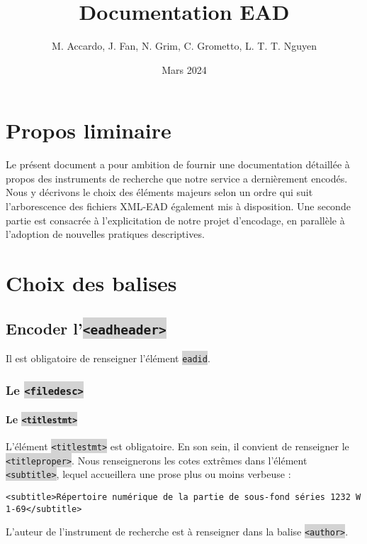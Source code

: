 \documentclass[hidelinks, 13pt]{report}
\title{Documentation EAD}
\date{Mars 2024}
\author{M. Accardo, J. Fan, N. Grim, C. Grometto, L. T. T. Nguyen}
\newcommand{\code}[1]{\colorbox{LightGray}{\texttt{#1}}}
\begin{document}
	
	\maketitle
	
	\tableofcontents
	
	\chapter{Propos liminaire}
	
	Le présent document a pour ambition de fournir une documentation détaillée à propos des instruments de recherche que notre service a dernièrement encodés. Nous y décrivons le choix des éléments majeurs selon un ordre qui suit l'arborescence des fichiers XML-EAD également mis à disposition. Une seconde partie est consacrée à l'explicitation de notre projet d'encodage, en parallèle à l'adoption de nouvelles pratiques descriptives.
	
	\chapter{Choix des balises}
	
	\section{Encoder l'\code{<eadheader>}}
	
	Il est obligatoire de renseigner l'élément \code{eadid}.
	
	\subsection{Le \code{<filedesc>}}
	
	\subsubsection{Le \code{<titlestmt>}}
	
	L'élément \code{<titlestmt>} est obligatoire. En son sein, il convient de renseigner le \code{<titleproper>}. Nous renseignerons les cotes extrêmes dans l'élément \code{<subtitle>}, lequel accueillera une prose plus ou moins verbeuse :
	
\begin{lstlisting}[language=EAD]
<subtitle>Répertoire numérique de la partie de sous-fond séries 1232 W 1-69</subtitle>
\end{lstlisting}	

	L'auteur de l'instrument de recherche est à renseigner dans la balise \code{<author>}.
\end{document}
